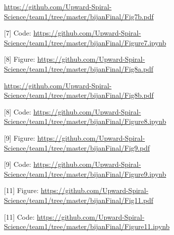 \documentclass{article}
\begin{document}
{\tiny \url{https://github.com/Upward-Spiral-Science/team1/tree/master/bijanFinal/Fig7b.pdf}}

[7] Code:
{\tiny \url{https://github.com/Upward-Spiral-Science/team1/tree/master/bijanFinal/Figure7.ipynb}}

[8] Figure:
{\tiny \url{https://github.com/Upward-Spiral-Science/team1/tree/master/bijanFinal/Fig8a.pdf}}

{\tiny \url{https://github.com/Upward-Spiral-Science/team1/tree/master/bijanFinal/Fig8b.pdf}}

[8] Code:
{\tiny \url{https://github.com/Upward-Spiral-Science/team1/tree/master/bijanFinal/Figure8.ipynb}}

[9] Figure:
{\tiny \url{https://github.com/Upward-Spiral-Science/team1/tree/master/bijanFinal/Fig9.pdf}}

[9] Code:
{\tiny \url{https://github.com/Upward-Spiral-Science/team1/tree/master/bijanFinal/Figure9.ipynb}}

[11] Figure:
{\tiny \url{https://github.com/Upward-Spiral-Science/team1/tree/master/bijanFinal/Fig11.pdf}}

[11] Code:
{\tiny \url{https://github.com/Upward-Spiral-Science/team1/tree/master/bijanFinal/Figure11.ipynb}}
\end{document}

